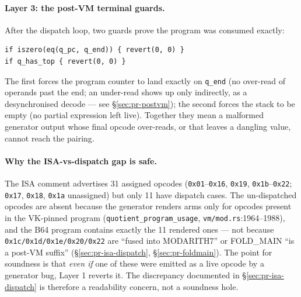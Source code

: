 \paragraph{Layer 3: the post-VM terminal guards.} After the
dispatch loop, two guards prove the program was consumed exactly:
\begin{lstlisting}[style=yul]
if iszero(eq(q_pc, q_end)) { revert(0, 0) }
if q_has_top { revert(0, 0) }
\end{lstlisting}
The first forces the program counter to land exactly on
\texttt{q\_end} (no over-read of operands past the end; an
under-read shows up only indirectly, as a desynchronised decode ---
see §\ref{sec:pr-postvm}); the second forces the stack to be
empty (no partial expression left live).
Together they mean a malformed generator output whose final opcode
over-reads, or that leaves a dangling value, cannot reach the
pairing.

\paragraph{Why the ISA-vs-dispatch gap is safe.} The ISA comment
advertises 31 assigned opcodes (\texttt{0x01}--\texttt{0x16},
\texttt{0x19}, \texttt{0x1b}--\texttt{0x22}; \texttt{0x17},
\texttt{0x18}, \texttt{0x1a} unassigned) but only 11 have dispatch
cases.  The un-dispatched opcodes are absent
because the generator renders arms only for opcodes present in
the VK-pinned program (\texttt{quotient\_\allowbreak{}program\_\allowbreak{}usage},
\texttt{vm/mod.rs}:1964--1988), and the B64 program contains
exactly the 11 rendered ones --- not because
\texttt{0x1c/\allowbreak{}0x1d/\allowbreak{}0x1e/\allowbreak{}0x20/\allowbreak{}0x22} are ``fused into MODARITH7'' or
FOLD\_MAIN ``is a post-VM suffix'' (§\ref{sec:pr-isa-dispatch},
§\ref{sec:pr-foldmain}). The point for soundness is that
\emph{even if} one of these were emitted as a live opcode by a
generator bug, Layer 1 reverts it. The discrepancy documented in
§\ref{sec:pr-isa-dispatch} is therefore a readability concern,
not a soundness hole.

